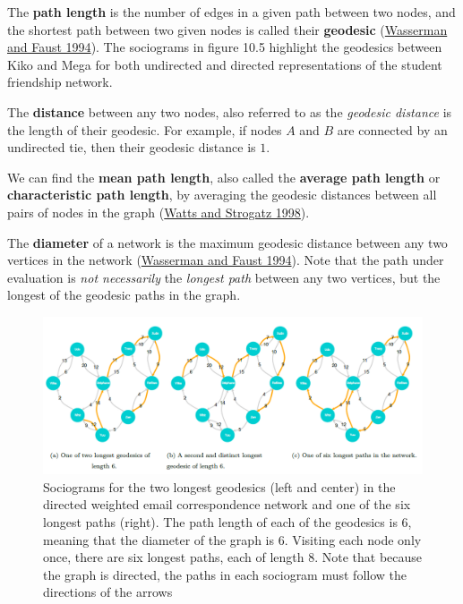 \documentclass{book}
\begin{document}
The \textbf{path length} is the number of edges in a given path between two
nodes, and the shortest path between two given nodes is called their
\textbf{geodesic} (\protect\hyperlink{ref-WassermanFaust1994}{Wasserman and
Faust 1994}). The sociograms in figure 10.5 highlight the geodesics between
Kiko and Mega for both undirected and directed representations of the student
friendship network.

The \textbf{distance} between any two nodes, also referred to as the
\emph{geodesic distance} is the length of their geodesic. For example, if
nodes \(A\) and \(B\) are connected by an undirected tie, then their geodesic
distance is \(1\).

We can find the \textbf{mean path length}, also called the \textbf{average
path length} or \textbf{characteristic path length}, by averaging the geodesic
distances between all pairs of nodes in the graph
(\protect\hyperlink{ref-WattsStrogatz1998}{Watts and Strogatz 1998}).

The \textbf{diameter} of a network is the maximum geodesic distance between
any two vertices in the network
(\protect\hyperlink{ref-WassermanFaust1994}{Wasserman and Faust 1994}). Note
that the path under evaluation is \emph{not necessarily} the \emph{longest
path} between any two vertices, but the longest of the geodesic paths in the
graph.

\begin{figure}
\centering
\includegraphics{images/social-networks/11-5.png}
\caption{Sociograms for the two longest geodesics (left and center) in the
directed weighted email correspondence network and one of the six longest
paths (right). The path length of each of the geodesics is 6, meaning that the
diameter of the graph is 6. Visiting each node only once, there are six
longest paths, each of length 8. Note that because the graph is directed, the
paths in each sociogram must follow the directions of the arrows}
\end{figure}
\end{document}

